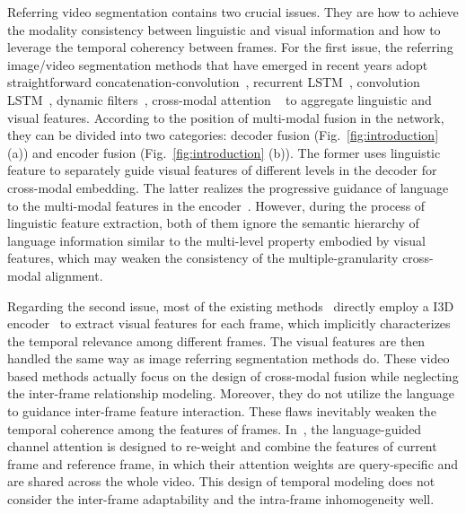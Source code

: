 \documentclass[10pt,twocolumn,letterpaper]{article}
\begin{document}
Referring video segmentation contains two crucial issues. They are how to achieve the modality consistency between linguistic and visual information and how to leverage the temporal coherency between frames. For the first issue, the referring image/video segmentation methods that have emerged in recent years adopt straightforward concatenation-convolution~\cite{hu2016segmentation}, recurrent LSTM~\cite{liu2017recurrent}, convolution LSTM~\cite{li2018referring}, dynamic filters~\cite{margffoy2018dynamic,gavrilyuk2018actor,wang2020context}, cross-modal attention ~\cite{shi2018key,ye2019cross,wang2019asymmetric,hu2020bi,huang2020referring,hui2020linguistic,seo2020urvos,feng2021encoder,hui2021collaborative,ding2021vision} to aggregate linguistic and visual features.
According to the position of multi-modal fusion in the network, they can be divided into two categories: decoder fusion (Fig.~\ref{fig:introduction} (a)) and encoder fusion (Fig.~\ref{fig:introduction} (b)).
The former uses linguistic feature to separately guide visual features of different levels in the decoder for cross-modal embedding. The latter realizes the progressive guidance of language to the multi-modal features in the encoder~\cite{feng2021encoder}.
However, during the process of linguistic feature extraction, both of them ignore the semantic hierarchy of language information similar to the multi-level property embodied by visual features, which may weaken the consistency of the multiple-granularity cross-modal alignment.



Regarding the second issue, most of the existing methods~\cite{gavrilyuk2018actor,wang2019asymmetric,wang2020context,mcintosh2020visual} directly employ a I3D encoder~\cite{carreira2017quo} to extract visual features for each frame, which implicitly characterizes the temporal relevance among different frames. The visual features are then handled the same way as image referring segmentation methods do. These video based methods actually focus on the design of cross-modal fusion while neglecting the inter-frame relationship modeling.
Moreover, they do not utilize the language to guidance inter-frame feature interaction. These flaws inevitably weaken the temporal coherence among the features of frames.
In~\cite{hui2021collaborative}, the language-guided channel attention is designed to re-weight and combine the features of current frame and reference frame, in which their attention weights are query-specific and are shared across the whole video. This design of temporal modeling does not consider the inter-frame adaptability and the intra-frame inhomogeneity well.
\end{document}
